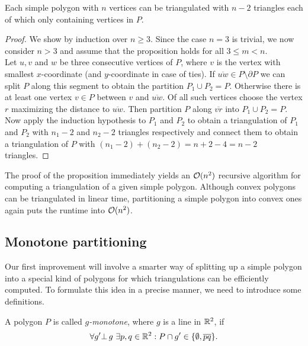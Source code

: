         \begin{proposition}
            Each simple polygon with $n$ vertices can be triangulated with $n-2$ triangles each of which only containing vertices in $P$.
        \end{proposition}
        \begin{proof}
            We show by induction over $n \geq 3$. Since the case $n = 3$ is trivial, we now consider $n > 3$ and assume that the proposition holds for all $3 \leq m < n$. \\
            Let $u, v$ and $w$ be three consecutive vertices of $P$, where $v$ is the vertex with smallest $x$-coordinate (and $y$-coordinate in case of ties). If $\overline{uw} \in P \setminus \partial P$ we can split $P$ along this segment to obtain the partition $P_1 \cup P_2 = P$. Otherwise there is at least one vertex $v \in P$ between $v$ and $\overline{uw}$. Of all such vertices choose the vertex $r$ maximizing the distance to $\overline{uw}$. Then partition $P$ along $\overline{vr}$ into $P_1 \cup P_2 = P$. \\
            Now apply the induction hypothesis to $P_1$ and $P_2$ to obtain a triangulation of $P_1$ and $P_2$ with $n_1 - 2$ and $n_2 - 2$ triangles respectively and connect them to obtain a triangulation of $P$ with $(n_1 - 2) + (n_2 - 2) = n + 2 - 4 =  n - 2$ triangles.
        \end{proof}

        \begin{remark}
            The proof of the proposition immediately yields an $\mathcal{O}(n^2)$ recursive algorithm for computing a triangulation of a given simple polygon. Although convex polygons can be triangulated in linear time, partitioning a simple polygon into convex ones again puts the runtime into $\mathcal{O}(n^2)$. 
        \end{remark} 

    \subsection{Monotone partitioning}
        Our first improvement will involve a smarter way of splitting up a simple polygon into a special kind of polygons for which triangulations can be efficiently computed. To formulate this idea in a precise manner, we need to introduce some definitions.

        \begin{definition}
            A polygon $P$ is called \emph{$g$-monotone}, where $g$ is a line in $\mathbb{R}^2$, if
            $$\forall g' \bot\, g \ \exists p, q \in \mathbb{R}^2: P \cap g' \in \{\emptyset, \overline{pq}\} .$$
        \end{definition}
        
